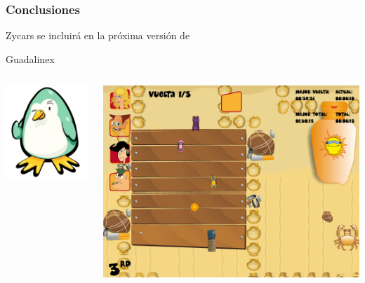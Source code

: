 \begin{frame}
    \frametitle{Conclusiones}
    \begin{center}
        {\huge Zycars se incluirá en la próxima versión de}\\
        \begin{center}
            {\Huge Guadalinex}
        \end{center}
    \end{center}

        
    \begin{columns}
    
        \column{100px}
        \begin{center}
            \includegraphics[scale=0.4]{imagenes/andatuz.png}
        \end{center}
        
        \column{200px}
        \begin{center}
            \includegraphics[scale=0.22]{imagenes/pantalla_juego.png}
        \end{center}
    \end{columns}

\end{frame}

